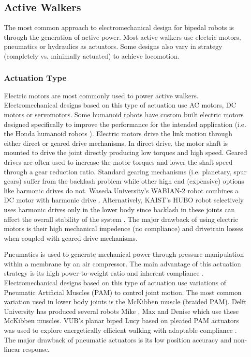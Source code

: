 

\subsection{Active Walkers} %
\label{sub:related_active_designs}
The most common approach to electromechanical design for bipedal robots is through the generation of active power. Most active walkers use  electric motors, pneumatics or hydraulics as actuators. Some designs also vary in strategy (completely vs. minimally actuated) to achieve locomotion. 

\subsubsection{Actuation Type} %
\label{ssub:actuation_type}

Electric motors are most commonly used to power active walkers. Electromechanical designs based on this type of actuation use AC motors, DC motors or servomotors. Some humanoid robots have custom built electric motors designed specifically to improve the performance for the intended application (i.e. the Honda humanoid robots \cite{Sakagami:2002cf,Hirai1998}). Electric motors drive the link motion through either direct or geared drive mechanisms. In direct drive, the motor shaft is mounted to drive the joint directly producing low torques and high speed. Geared drives are often used to increase the motor torques and lower the shaft speed through a gear reduction ratio. Standard gearing mechanisms (i.e. planetary, spur gears) suffer from the backlash problem while other high end (expensive) options like harmonic drives do not. Waseda University's WABIAN-2 robot combines a DC motor with harmonic drive \cite{Ogura:2006bm}. Alternatively, KAIST's HUBO robot selectively uses harmonic drives only in the lower body since backlash in these joints can affect the overall stability of the system \cite{IllWooPark:2005et}. The major drawback of using electric motors is their high mechanical impedence (no compliance) and drivetrain losses when coupled with geared drive mechanisms.  

Pneumatics is used to generate mechanical power through pressure manipulation within a membrane by an air compressor. The main advantage of this actuation strategy is its high power-to-weight ratio and inherent compliance \cite{Wisse2007}. Electromechanical designs based on this type of actuation use variations of Pneumatic Artificial Muscles (PAM) to control joint motion. The most common variation used in lower body joints is the McKibben muscle (braided PAM). Delft University has produced several robots Mike \cite{Wisse2003}, Max \cite{Hobbelen2005} and Denise \cite{Hobbelen2008,Wisse:2007wh} which use these McKibben muscles. VUB's planar biped Lucy based on pleated PAM actuators was used to explore energetically efficient walking with adaptable compliance \cite{Vanderborght:2005kq}. The major drawback of pneumatic actuators is its low position accuracy and non-linear response. 

